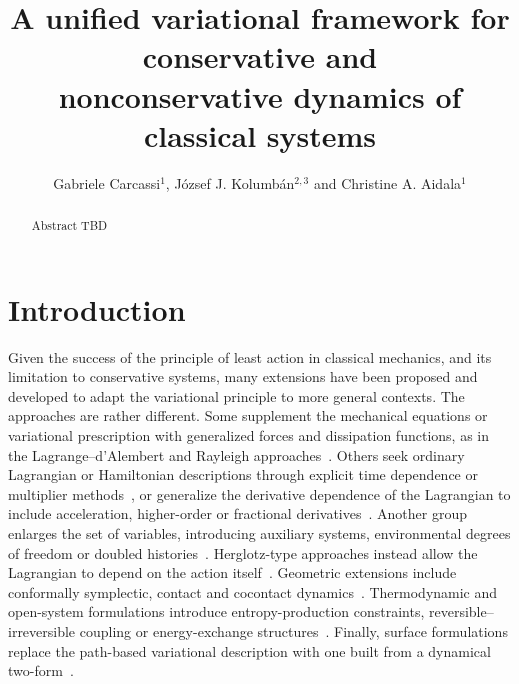 \documentclass[nofootinbib,aps,pre]{revtex4-2}
\begin{document}
\title{A unified variational framework for conservative and \\nonconservative dynamics of classical systems}

\author{Gabriele Carcassi$^1$, J\'ozsef J. Kolumb\'an$^{2,3}$ and Christine A. Aidala$^1$
}



\begin{abstract}
    Abstract TBD
\end{abstract}
\maketitle

\section{Introduction}

Given the success of the principle of least action in classical mechanics, and its limitation to conservative systems, many extensions have been proposed and developed to adapt the variational principle to more general contexts. The approaches are rather different. Some supplement the mechanical equations or variational prescription with generalized forces and dissipation functions, as in the Lagrange--d'Alembert and Rayleigh approaches~\cite{gaybalmaz,minguzzi}. Others seek ordinary Lagrangian or Hamiltonian descriptions through explicit time dependence or multiplier methods~\cite{kanai,nuccitamizhmani}, or generalize the derivative dependence of the Lagrangian to include acceleration, higher-order or fractional derivatives~\cite{paisuhlenbeck,riewe,almeidamalinowska}. Another group enlarges the set of variables, introducing auxiliary systems, environmental degrees of freedom or doubled histories~\cite{bateman,caldeiraleggett,galley,galleytsangstein,martindiego}. Herglotz-type approaches instead allow the Lagrangian to depend on the action itself~\cite{lazo,almeidamalinowska}. Geometric extensions include conformally symplectic, contact and cocontact dynamics~\cite{mclachlan,bravetti,cocontact}. Thermodynamic and open-system formulations introduce entropy-production constraints, reversible--irreversible coupling or energy-exchange structures~\cite{gaybalmaz,gaybalmazopen,generic,porthamiltonian}. Finally, surface formulations replace the path-based variational description with one built from a dynamical two-form~\cite{kochanstrings,kochan}.
\end{document}
